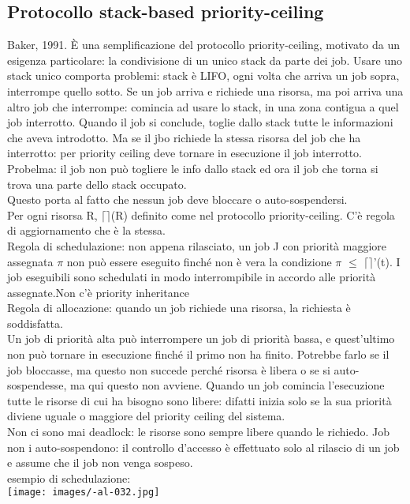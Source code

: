 \documentclass{article}
\begin{document}
\subsection{Protocollo stack-based priority-ceiling}
Baker, 1991. È una semplificazione del protocollo priority-ceiling, motivato da un esigenza particolare: la condivisione di un unico stack da parte dei job. Usare uno stack unico comporta problemi: stack è LIFO, ogni volta che arriva un job sopra, interrompe quello sotto. Se un job arriva e richiede una risorsa, ma poi arriva una altro job che interrompe: comincia ad usare lo stack, in una zona contigua a quel job interrotto. Quando il job si conclude, toglie dallo stack tutte le informazioni che aveva introdotto. Ma se il jbo richiede la stessa risorsa del job che ha interrotto: per priority ceiling deve tornare in esecuzione il job interrotto. Probelma: il job non può togliere le info dallo stack ed ora il job che torna si trova una parte dello stack occupato.\\ Questo porta al fatto che nessun job deve bloccare o auto-sospendersi.\\ Per ogni risorsa R, $\lceil\rceil$(R) definito come nel protocollo priority-ceiling. C'è regola di aggiornamento che  è la stessa. \\ Regola di schedulazione: non appena rilasciato, un job J con priorità maggiore assegnata $\pi$ non può essere eseguito finché non è vera la condizione $\pi$ $\leq$ $\lceil\rceil$'(t). I job eseguibili sono schedulati in modo interrompibile in accordo alle priorità assegnate.Non c'è priority inheritance\\ Regola di allocazione: quando un job richiede una risorsa, la richiesta è soddisfatta.\\ Un job di priorità alta può interrompere un job di priorità bassa, e quest'ultimo non può tornare in esecuzione finché il primo non ha finito. Potrebbe farlo se il job bloccasse, ma questo non succede perché risorsa è libera o se si auto-sospendesse, ma qui questo non avviene. Quando un job comincia l'esecuzione tutte le risorse di cui ha bisogno sono libere: difatti inizia solo se la sua priorità diviene uguale o maggiore del priority ceiling del sistema.\\ Non ci sono mai deadlock: le risorse sono sempre libere quando le richiedo. Job non i auto-sospendono: il controllo d'accesso è effettuato solo al rilascio di un job e assume che il job non venga sospeso.\\ esempio di schedulazione:\\
\texttt{[image: images/-al-032.jpg]}
\end{document}
